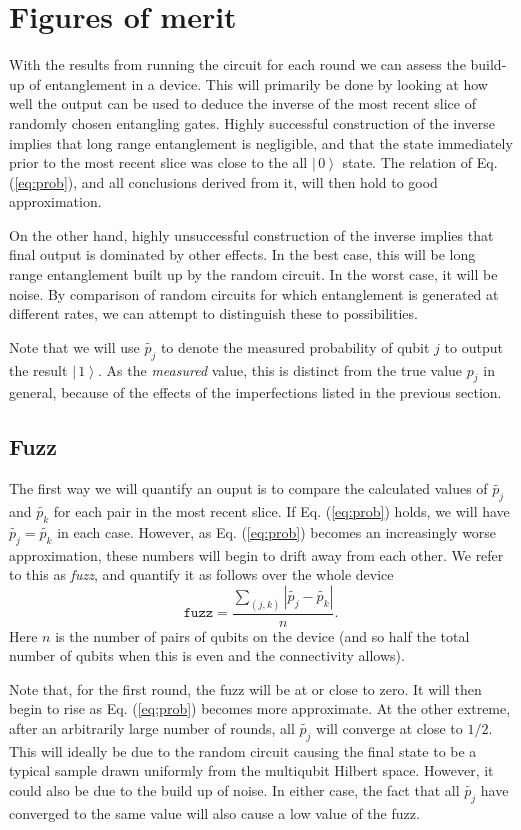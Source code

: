 \documentclass[aps,prl,twocolumn,showpacs,preprintnumbers]{revtex4-1}
\newcommand{\be}{\begin{equation}}
\newcommand{\ee}{\end{equation}}
\newcommand{\ket}[1]{\left | \, #1 \right\rangle}
\begin{document}
\section{Figures of merit}

With the results from running the circuit for each round we can assess the build-up of entanglement in a device. This will primarily be done by looking at how well the output can be used to deduce the inverse of the most recent slice of randomly chosen entangling gates. Highly successful construction of the inverse implies that long range entanglement is negligible, and that the state immediately prior to the most recent slice was close to the all $\ket{0}$ state. The relation of Eq. (\ref{eq:prob}), and all conclusions derived from it, will then hold to good approximation.

On the other hand, highly unsuccessful construction of the inverse implies that final output is dominated by other effects. In the best case, this will be long range entanglement built up by the random circuit. In the worst case, it will be noise. By comparison of random circuits for which entanglement is generated at different rates, we can attempt to distinguish these to possibilities.

Note that we will use $\tilde{p_j}$ to denote the measured probability of qubit $j$ to output the result $\ket{1}$. As the \textit{measured} value, this is distinct from the true value $p_j$ in general, because of the effects of the imperfections listed in the previous section.

\subsection{Fuzz}

The first way we will quantify an ouput is to compare the calculated values of $\tilde{p_j}$ and $\tilde{p_k}$ for each pair in the most recent slice. If Eq. (\ref{eq:prob}) holds, we will have $\tilde{p_j}=\tilde{p_k}$ in each case. However, as Eq. (\ref{eq:prob}) becomes an increasingly worse approximation, these numbers will begin to drift away from each other. We refer to this as \textit{fuzz}, and quantify it as follows over the whole device
\be
\mathtt{fuzz} = \frac{ \sum_{(j,k)} | \tilde{p_j} - \tilde{p_k} | }{ n }.
\ee
Here $n$ is the number of pairs of qubits on the device (and so half the total number of qubits when this is even and the connectivity allows).

Note that, for the first round, the fuzz will be at or close to zero. It will then begin to rise as Eq. (\ref{eq:prob}) becomes more approximate. At the other extreme, after an arbitrarily large number of rounds, all $\tilde{p_j}$ will converge at close to $1/2$. This will ideally be due to the random circuit causing the final state to be a typical sample drawn uniformly from the multiqubit Hilbert space. However, it could also be due to the build up of noise. In either case, the fact that all $\tilde{p_j}$ have converged to the same value will also cause a low value of the fuzz.
\end{document}

